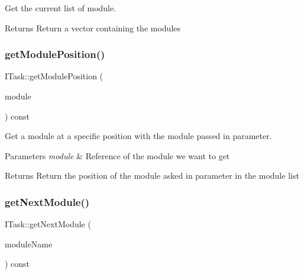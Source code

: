 Get the current list of module. 

\begin{DoxyReturn}{Returns}
Return a vector containing the modules 
\end{DoxyReturn}
\mbox{\label{classxzia_1_1ITask_a74496410e5dbd3c293082af3d5e7d84f}} 
\subsubsection{\texorpdfstring{get\+Module\+Position()}{getModulePosition()}}
{\footnotesize\ttfamily I\+Task\+::get\+Module\+Position (\begin{DoxyParamCaption}\item[{\mbox{\hyperlink{classxzia_1_1AHTTPModule}{A\+H\+T\+T\+P\+Module}} const \&}]{module }\end{DoxyParamCaption}) const\hspace{0.3cm}{\ttfamily [pure virtual]}}



Get a module at a specific position with the module passed in parameter. 


\begin{DoxyParams}{Parameters}
{\em module} & Reference of the module we want to get \\
\hline
\end{DoxyParams}
\begin{DoxyReturn}{Returns}
Return the position of the module asked in parameter in the module list 
\end{DoxyReturn}
\mbox{\label{classxzia_1_1ITask_aa9134b2c523aa55d5f9cfe12866ed508}} 
\subsubsection{\texorpdfstring{get\+Next\+Module()}{getNextModule()}}
{\footnotesize\ttfamily I\+Task\+::get\+Next\+Module (\begin{DoxyParamCaption}\item[{std\+::string const \&}]{module\+Name }\end{DoxyParamCaption}) const\hspace{0.3cm}{\ttfamily [pure virtual]}}



